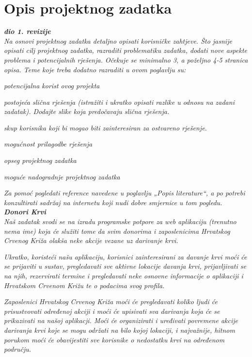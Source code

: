 \chapter{Opis projektnog zadatka}
		
		\textbf{\textit{dio 1. revizije}}\\
		
		\textit{Na osnovi projektnog zadatka detaljno opisati korisničke zahtjeve. Što jasnije opisati cilj projektnog zadatka, razraditi problematiku zadatka, dodati nove aspekte problema i potencijalnih rješenja. Očekuje se minimalno 3, a poželjno 4-5 stranica opisa.	Teme koje treba dodatno razraditi u ovom poglavlju su:}
		\begin{packed_item}
			\item \textit{potencijalna korist ovog projekta}
			\item \textit{postojeća slična rješenja (istražiti i ukratko opisati razlike u odnosu na zadani zadatak). Dodajte slike koja predočavaju slična rješenja.}
			\item \textit{skup korisnika koji bi mogao biti zainteresiran za ostvareno rješenje.}
			\item \textit{mogućnost prilagodbe rješenja }
			\item \textit{opseg projektnog zadatka}
			\item \textit{moguće nadogradnje projektnog zadatka}
		\end{packed_item}
		
		\textit{Za pomoć pogledati reference navedene u poglavlju „Popis literature“, a po potrebi konzultirati sadržaj na internetu koji nudi dobre smjernice u tom pogledu.}\\

		\textbf{\textit{Donori Krvi}}\\

		\textit{Naš zadatak svodi se na izradu programske potpore za web aplikaciju (trenutno nema ime) koja će služiti tome da svim donorima i zaposlenicima Hrvatskog Crvenog Križa olakša neke akcije vezane uz darivanje krvi.}

		\textit{Ukratko, koristeći našu aplikaciju, korisnici zainteresirani za davanje krvi moći će se prijaviti u sustav, pregledavati sve aktivne lokacije davanja krvi, prijavljivati se na njih, rezervirati termine i pregledavati neke osnovne informacije o aplikaciji i Hrvatskom Crvenom Križu te o podacima svog profila.}

		\textit{Zaposlenici Hrvatskog Crvenog Križa moći će pregledavati koliko ljudi će prisustvovati određenoj akciji i moći će upisivati sva darivanja koja će se prikazivati na našoj aplikacji. Moći će organizirati i uređivati povremene akcije darivanja krvi koje se mogu održati na bilo kojoj lokaciji, i najvažnije, hitnom porukom moći će obavijestiti sve korisnike o nedostatku krvi na određenom području.}

